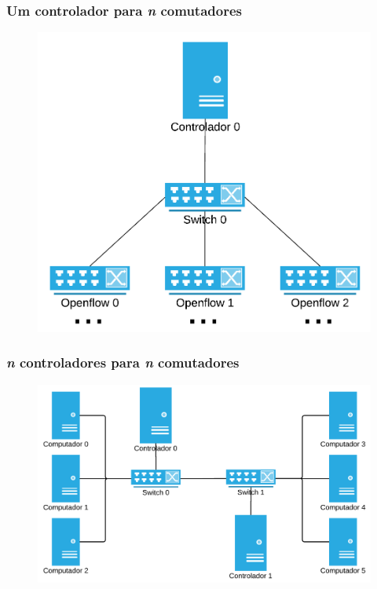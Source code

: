 %
%
\begin{frame}\frametitle{Um controlador para \emph{n} comutadores}

	\begin{figure}[h]
        \centering
        \includegraphics[scale=.8]{images/controller-n-switches}
    \end{figure}
\end{frame}


%
%
\begin{frame}\frametitle{\emph{n} controladores para \emph{n} comutadores}

	\begin{figure}[h]\hspace*{-1cm}
        \centering
        \includegraphics[scale=.8]{images/n-controllers-n-switches}
    \end{figure}
\end{frame}



